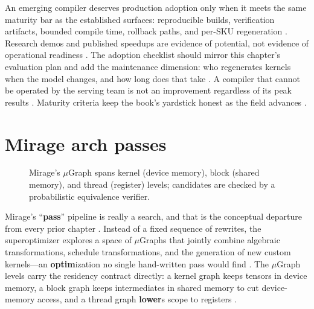 An emerging compiler deserves production adoption only when it meets the same maturity bar as the established surfaces: reproducible builds, verification artifacts, bounded compile time, rollback paths, and per-SKU regeneration \citep{wu2024mirage,patel2025llminference,memoryfloor2026}. Research demos and published speedups are evidence of potential, not evidence of operational readiness \citep{wu2024mirage,taxbreak2026}. The adoption checklist should mirror this chapter's evaluation plan and add the maintenance dimension: who regenerates kernels when the model changes, and how long does that take \citep{chen2020compilerbasedhardw,wu2024mirage}. A compiler that cannot be operated by the serving team is not an improvement regardless of its peak results \citep{patel2025llminference,memoryfloor2026}. Maturity criteria keep the book's yardstick honest as the field advances \citep{wu2024mirage,taxbreak2026}.

\section{Mirage arch passes}
\label{sec:ch20_mirage_arch_passes}


\begin{figure}[t]
\centering
{}
\caption{Mirage's $\mu$Graph spans kernel (device memory), block (shared memory), and thread (register) levels; candidates are checked by a probabilistic equivalence verifier.}
\label{fig:mirage_arch_passes_architecture}
\end{figure}

Mirage's ``\textbf{pass}'' pipeline is really a search, and that is the conceptual departure from every prior chapter \citep{wu2024mirage}. Instead of a fixed sequence of rewrites, the superoptimizer explores a space of $\mu$Graphs that jointly combine algebraic transformations, schedule transformations, and the generation of new custom kernels---an \textbf{optim}ization no single hand-written pass would find \citep{wu2024mirage}. The $\mu$Graph levels carry the residency contract directly: a kernel graph keeps tensors in device memory, a block graph keeps intermediates in shared memory to cut device-memory access, and a thread graph \textbf{lower}s scope to registers \citep{wu2024mirage}.


